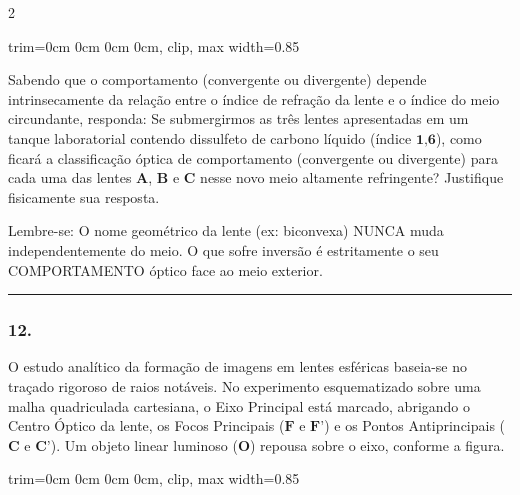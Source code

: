 \documentclass[twoside, 10pt, a4paper]{article}
\newlength{\espacoPreQuestao}\setlength{\espacoPreQuestao}{0.1cm}
\newlength{\espacoQuestao}\setlength{\espacoQuestao}{0.2cm}
\newcommand{\larguraTikz}{0.85\linewidth}
\begin{document}
\begin{multicols*}{2}
\begin{center}
\begin{adjustbox}{trim=0cm 0cm 0cm 0cm, clip, max width=\larguraTikz}
\end{adjustbox}
\end{center}
Sabendo que o comportamento (convergente ou divergente) depende intrinsecamente da relação entre o índice de refração da lente e o índice do meio circundante, responda:
Se submergirmos as três lentes apresentadas em um tanque laboratorial contendo dissulfeto de carbono líquido (índice $ \textbf{1,6} $), como ficará a classificação óptica de comportamento (convergente ou divergente) para cada uma das lentes \textbf{A}, \textbf{B} e \textbf{C} nesse novo meio altamente refringente? Justifique fisicamente sua resposta.
\par\vspace{\espacoQuestao}

\begin{boxdica}
Lembre-se: O nome geométrico da lente (ex: biconvexa) NUNCA muda independentemente do meio. O que sofre inversão é estritamente o seu COMPORTAMENTO óptico face ao meio exterior.
\end{boxdica}

\noindent\textcolor{CorLinha}{\rule{\linewidth}{0.5pt}} 
\par\vspace{\espacoPreQuestao}
\subsubsection*{12.} O estudo analítico da formação de imagens em lentes esféricas baseia-se no traçado rigoroso de raios notáveis. No experimento esquematizado sobre uma malha quadriculada cartesiana, o Eixo Principal está marcado, abrigando o Centro Óptico da lente, os Focos Principais ($ \textbf{F} $ e $ \textbf{F'} $) e os Pontos Antiprincipais ($ \textbf{C} $ e $ \textbf{C'} $). Um objeto linear luminoso ($ \textbf{O} $) repousa sobre o eixo, conforme a figura.
\begin{center}
\begin{adjustbox}{trim=0cm 0cm 0cm 0cm, clip, max width=\larguraTikz}
\end{adjustbox}
\end{center}
\end{multicols*}
\end{document}
